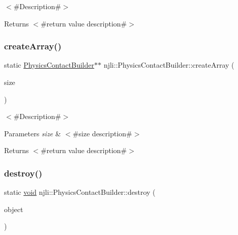 $<$\#\+Description\#$>$

\begin{DoxyReturn}{Returns}
$<$\#return value description\#$>$ 
\end{DoxyReturn}
\mbox{\label{classnjli_1_1_physics_contact_builder_a131af3c4be72ee68c6a93cfd6969d152}} 
\subsubsection{\texorpdfstring{create\+Array()}{createArray()}}
{\footnotesize\ttfamily static \mbox{\hyperlink{classnjli_1_1_physics_contact_builder}{Physics\+Contact\+Builder}}$\ast$$\ast$ njli\+::\+Physics\+Contact\+Builder\+::create\+Array (\begin{DoxyParamCaption}\item[{const \mbox{\hyperlink{_util_8h_a10e94b422ef0c20dcdec20d31a1f5049}{u32}}}]{size }\end{DoxyParamCaption})\hspace{0.3cm}{\ttfamily [static]}}

$<$\#\+Description\#$>$


\begin{DoxyParams}{Parameters}
{\em size} & $<$\#size description\#$>$\\
\hline
\end{DoxyParams}
\begin{DoxyReturn}{Returns}
$<$\#return value description\#$>$ 
\end{DoxyReturn}
\mbox{\label{classnjli_1_1_physics_contact_builder_a710a5f30180c6c5575f9f6330613130b}} 
\subsubsection{\texorpdfstring{destroy()}{destroy()}}
{\footnotesize\ttfamily static \mbox{\hyperlink{_thread_8h_af1e856da2e658414cb2456cb6f7ebc66}{void}} njli\+::\+Physics\+Contact\+Builder\+::destroy (\begin{DoxyParamCaption}\item[{\mbox{\hyperlink{classnjli_1_1_physics_contact_builder}{Physics\+Contact\+Builder}} $\ast$}]{object }\end{DoxyParamCaption})\hspace{0.3cm}{\ttfamily [static]}}

